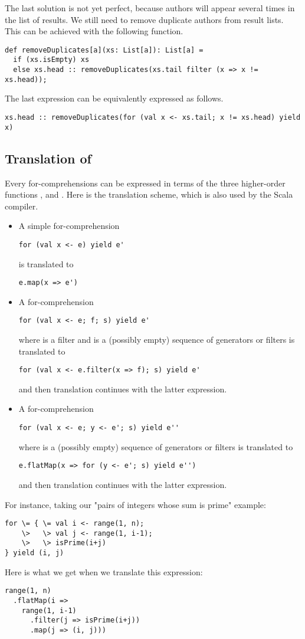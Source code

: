 \documentclass[11pt]{report}
\begin{document}
The last solution is not yet perfect, because authors will appear
several times in the list of results.  We still need to remove
duplicate authors from result lists.  This can be achieved with the
following function.
\begin{verbatim}
def removeDuplicates[a](xs: List[a]): List[a] =
  if (xs.isEmpty) xs
  else xs.head :: removeDuplicates(xs.tail filter (x => x != xs.head));
\end{verbatim}
The last expression can be equivalently expressed as follows.
\begin{verbatim}
xs.head :: removeDuplicates(for (val x <- xs.tail; x != xs.head) yield x)
\end{verbatim}

\subsection*{Translation of }

Every for-comprehensions can be expressed in terms of the three
higher-order functions \verb@map@, \verb@flatMap@ and \verb@filter@.
Here is the translation scheme, which is also used by the Scala compiler.
\begin{itemize}
\item
A simple for-comprehension
\begin{verbatim}
for (val x <- e) yield e'
\end{verbatim}
is translated to
\begin{verbatim}
e.map(x => e')
\end{verbatim}
\item
A for-comprehension
\begin{verbatim}
for (val x <- e; f; s) yield e'
\end{verbatim}
where \verb@f@ is a filter and \verb@s@ is a (possibly empty)
sequence of generators or filters
is translated to
\begin{verbatim}
for (val x <- e.filter(x => f); s) yield e'
\end{verbatim}
and then translation continues with the latter expression.
\item
A for-comprehension
\begin{verbatim}
for (val x <- e; y <- e'; s) yield e''
\end{verbatim}
where \verb@s@ is a (possibly empty)
sequence of generators or filters
is translated to
\begin{verbatim}
e.flatMap(x => for (y <- e'; s) yield e'')
\end{verbatim}
and then translation continues with the latter expression.
\end{itemize}
For instance, taking our "pairs of integers whose sum is prime" example:
\begin{verbatim}
for \= { \= val i <- range(1, n);
    \>   \> val j <- range(1, i-1);
    \>   \> isPrime(i+j)
} yield (i, j)
\end{verbatim}
Here is what we get when we translate this expression:
\begin{verbatim}
range(1, n)
  .flatMap(i =>
    range(1, i-1)
      .filter(j => isPrime(i+j))
      .map(j => (i, j)))
\end{verbatim}
\end{document}
